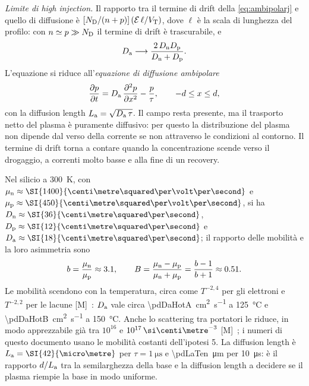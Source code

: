 \documentclass[10pt,a4paper]{scrartcl}
\let\newcommand\pdvaluedefine
\newcommand{\VT}{V_\mathrm{T}}
\newcommand{\Ef}{\mathcal{E}}                 %
\newcommand{\ND}{N_\mathrm{D}}
\newcommand{\Da}{D_\mathrm{a}}
\newcommand{\La}{L_\mathrm{a}}
\newcommand{\Dn}{D_\mathrm{n}}
\newcommand{\Dp}{D_\mathrm{p}}
\newcommand{\mun}{\mu_\mathrm{n}}
\newcommand{\mup}{\mu_\mathrm{p}}
\newcommand{\cmc}{\si{\centi\metre^{-3}}}
\newcommand{\dpar}[2]{\frac{\partial #1}{\partial #2}}
\newcommand{\dparq}[2]{\frac{\partial^2 #1}{\partial #2^2}}
\begin{document}
\emph{Limite di high injection.} Il rapporto tra il termine di drift della \eqref{eq:ambipolarj} e quello di diffusione è $[\ND/(n+p)]\,(\Ef\,\ell/\VT)$, dove $\ell$ è la scala di lunghezza del profilo: con $n \simeq p \gg \ND$ il termine di drift è trascurabile, e
\begin{equation}
\Da \longrightarrow \frac{2\,\Dn\Dp}{\Dn + \Dp} .
\label{eq:da}
\end{equation}
L'equazione si riduce all'\emph{equazione di diffusione ambipolare}
\begin{equation}
\dpar{p}{t} = \Da\,\dparq{p}{x} - \frac{p}{\tau} , \qquad -d \leq x \leq d ,
\label{eq:diffusion}
\end{equation}
con la diffusion length $\La = \sqrt{\Da\,\tau}$. Il campo resta presente, ma il trasporto netto del plasma è puramente diffusivo: per questo la distribuzione del plasma non dipende dal verso della corrente se non attraverso le condizioni al contorno. Il termine di drift torna a contare quando la concentrazione scende verso il drogaggio, a correnti molto basse e alla fine di un recovery.

Nel silicio a \SI{300}{\kelvin}, con $\mun \approx \SI{\pdMun}{\centi\metre\squared\per\volt\per\second}$ e $\mup \approx \SI{\pdMup}{\centi\metre\squared\per\volt\per\second}$, si ha $\Dn \approx \SI{\pdDn}{\centi\metre\squared\per\second}$, $\Dp \approx \SI{\pdDp}{\centi\metre\squared\per\second}$ e $\Da \approx \SI{\pdDa}{\centi\metre\squared\per\second}$; il rapporto delle mobilità e la loro asimmetria sono
\begin{equation}
b = \frac{\mun}{\mup} \approx \pdBratio , \qquad B = \frac{\mun - \mup}{\mun + \mup} = \frac{b-1}{b+1} \approx \pdBmob .
\label{eq:bdef}
\end{equation}
Le mobilità scendono con la temperatura, circa come $T^{-2,4}$ per gli elettroni e $T^{-2,2}$ per le lacune [M]~\cite{sze}: $\Da$ vale circa \SI{\pdDaHotA}{\centi\metre\squared\per\second} a \SI{125}{\celsius} e \SI{\pdDaHotB}{\centi\metre\squared\per\second} a \SI{150}{\celsius}. Anche lo scattering tra portatori le riduce, in modo apprezzabile già tra $10^{16}$ e $10^{17}\,\cmc$ [M]~\cite{lutz}; i numeri di questo documento usano le mobilità costanti dell'ipotesi 5. La diffusion length è $\La = \SI{\pdLaOne}{\micro\metre}$ per $\tau = \SI{1}{\micro\second}$ e \SI{\pdLaTen}{\micro\metre} per \SI{10}{\micro\second}: è il rapporto $d/\La$ tra la semilarghezza della base e la diffusion length a decidere se il plasma riempie la base in modo uniforme.
\end{document}
